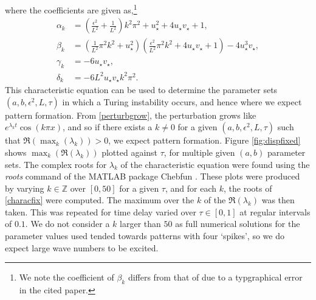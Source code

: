 where the coefficients are given as,\footnote{We note the coefficient of $\beta_k$ differs from that of \cite{yigaffneyli} due to a typgraphical error in the cited paper.}
\begin{align}
\alpha_k&=\left(\frac{\epsilon^2}{L^2}+\frac{1}{L^2}\right)k^2\pi^2+u_\star^2+4u_\star v_\star+1,\\
\beta_k&=\left(\frac{1}{L^2}\pi^2k^2+u_\star^2\right)\left(\frac{\epsilon^2}{L^2}\pi^2k^2+4u_\star v_\star+1\right)-4u_\star^3v_\star,\\
\gamma_k&=-6u_\star v_\star,\\
\delta_k&=-{6}{L^2}u_\star v_\star k^2\pi^2.
\end{align}
This characteristic equation can be used to determine the parameter sets $(a,b,\epsilon^2,L,\tau)$ in which a Turing instability occurs, and hence where we expect pattern formation. From \eqref{perturbgrow}, the perturbation grows like $e^{\lambda_k t}\cos(k\pi x)$, and so if there exists a $k\neq0$ for a given $(a,b,\epsilon^2,L,\tau)$ such that $\Re(\max_k(\lambda_k))>0$, we expect pattern formation. Figure \ref{fig:dispfixed} shows $\max_k(\Re(\lambda_k))$ plotted against $\tau$, for multiple given $(a,b)$ parameter sets. The complex roots for $\lambda_k$ of the characteristic equation were found using the \emph{roots} command of the MATLAB package Chebfun \cite{chebfun}. These plots were produced by varying $k\in\mathbb{Z}$ over $[0,50]$ for a given $\tau$, and for each $k$, the roots of \eqref{characfix} were computed. The maximum over the $k$ of the $\Re(\lambda_k)$ was then taken. This was repeated for time delay varied over $\tau\in[0,1]$ at regular intervals of $0.1$. We do not consider a $k$ larger than $50$ as full numerical solutions for the parameter values used tended towards patterns with four `spikes', so we do expect large wave numbers to be excited.

